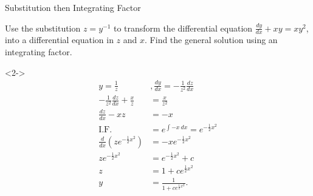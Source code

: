 \documentclass[8pt]{beamer}
\begin{document}
\begin{frame}{Substitution then Integrating Factor}
	\begin{problem}
		Use the substitution $z=y^{-1}$ to transform the differential equation $\frac{dy}{dx}+xy=xy^2$, into a differential equation in $z$ and $x$. Find the general solution using an integrating factor.
	\end{problem}
	\begin{solution}<2->
		\begin{align*}
			y=\frac{1}{z} &, \frac{dy}{dx}= -\frac{1}{z^2}\frac{dz}{dx} \\
			-\frac{1}{z^2}\frac{dz}{dx}+\frac{x}{z} &= \frac{x}{z^2} \\
			\frac{dz}{dx} -xz &= -x \\
			\text{I.F.} &= e^{\int -x\ dx}=e^{-\frac{1}{2}x^2} \\
			\frac{d}{dx}\left( ze^{-\frac{1}{2}x^2} \right) &= -xe^{-\frac{1}{2}x^2} \\
			ze^{-\frac{1}{2}x^2} &= e^{-\frac{1}{2}x^2}+c \\
			z &= 1+ce^{\frac{1}{2}x^2} \\
			y &= \frac{1}{1+ce^{\frac{1}{2}x^2}}
		.\end{align*}
	\end{solution}
\end{frame}
\end{document}
